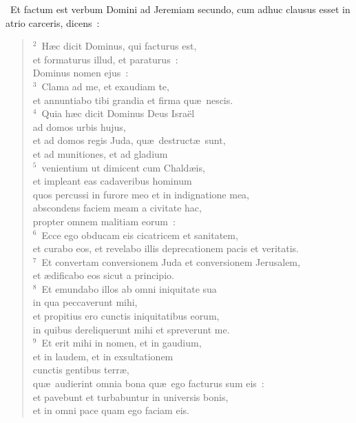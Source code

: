 ~Et factum est verbum Domini ad Jeremiam secundo, cum adhuc clausus esset in atrio carceris, dicens~:
\begin{flushleft}\begin{verse}\vspace{6pt}${}^{2}$~H\ae c dicit Dominus, qui facturus est,\\ et formaturus illud, et paraturus~:\\ Dominus nomen ejus~:\\
${}^{3}$~Clama ad me, et exaudiam te,\\ et annuntiabo tibi grandia et firma qu\ae\ nescis.\\
${}^{4}$~Quia h\ae c dicit Dominus Deus Isra\"el\\ ad domos urbis hujus,\\ et ad domos regis Juda, qu\ae\ destruct\ae\ sunt,\\ et ad munitiones, et ad gladium\\
${}^{5}$~venientium ut dimicent cum Chald\ae is,\\ et impleant eas cadaveribus hominum\\ quos percussi in furore meo et in indignatione mea,\\ abscondens faciem meam a civitate hac,\\ propter omnem malitiam eorum~:\\
${}^{6}$~Ecce ego obducam eis cicatricem et sanitatem,\\ et curabo eos, et revelabo illis deprecationem pacis et veritatis.\\
${}^{7}$~Et convertam conversionem Juda et conversionem Jerusalem,\\ et \ae dificabo eos sicut a principio.\\
${}^{8}$~Et emundabo illos ab omni iniquitate sua\\ in qua peccaverunt mihi,\\ et propitius ero cunctis iniquitatibus eorum,\\ in quibus dereliquerunt mihi et spreverunt me.\\
${}^{9}$~Et erit mihi in nomen, et in gaudium,\\ et in laudem, et in exsultationem\\ cunctis gentibus terr\ae ,\\ qu\ae\ audierint omnia bona qu\ae\ ego facturus sum eis~:\\ et pavebunt et turbabuntur in universis bonis,\\ et in omni pace quam ego faciam eis.\\

\end{verse}
\end{flushleft}
